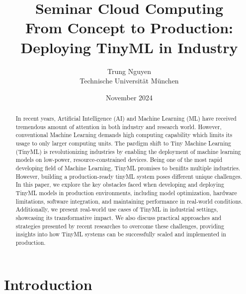 \documentclass[twocolumn]{article}
\author{Trung Nguyen\\ Technische Universit\"at M\"unchen}
\title{Seminar Cloud Computing \\
       {\bf From Concept to Production: Deploying TinyML in Industry}
}
\date{November 2024}
\begin{document}
\maketitle

\begin{abstract}
In recent years, Artificial Intelligence (AI) and Machine Learning (ML) have received tremendous amount of attention in both industry and research world. However, conventional Machine Learning demands high computing capability which limits its usage to only larger computing units. The pardigm shift to Tiny Machine Learning (TinyML) is revolutionizing industries by enabling the deployment of machine learning models on low-power, resource-constrained devices. Being one of the most rapid developing field of Machine Learning, TinyML promises to benifits multiple industries. However, building a production-ready tinyML system poses different unique challenges. In this paper, we explore the key obstacles faced when developing and deploying TinyML models in production environments, including model optimization, hardware limitations, software integration, and maintaining performance in real-world conditions. Additionally, we present real-world use cases of TinyML in industrial settings, showcasing its transformative impact. We also discuss practical approaches and strategies presented by recent researches \cite{ren_tinyol_2021} to overcome these challenges, providing insights into how TinyML systems can be successfully scaled and implemented in production.
\end{abstract}

\section{Introduction}

\label{introduction}
\end{document}
